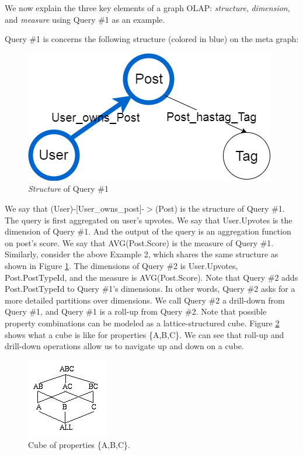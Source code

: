 We now explain the three key elements of a graph OLAP: \textit{structure}, \textit{dimension}, and \textit{measure}  using Query \#1 as an example.


Query \#1 is concerns the following structure (colored in blue) on the meta graph:

\begin{figure}[H]
\centering
\includegraphics[scale=0.5]{pic/meta1.png}
\caption{\textit{Structure} of Query \#1}
\label{fig:2:1}
\end{figure}



We say that (User)-[User\_owns\_post]-$>$(Post) is the structure of Query \#1. The query is first aggregated on user’s upvotes. We say that {User.Upvotes} is the dimension of Query \#1. And the output of the query is an aggregation function on post’s score.  We say that {AVG(Post.Score)} is the measure of Query \#1. Similarly, consider the above Example 2, which shares the same structure as shown in Figure \ref{fig:2:1}. The dimensions of Query \#2 is {User.Upvotes, Post.PostTypeId}, and the measure is {AVG(Post.Score)}. Note that Query \#2 adds Post.PostTypeId to Query \#1’s dimensions. In other words, Query \#2 asks for a more detailed partitions over dimensions. We call Query \#2 a drill-down from Query \#1, and  Query \#1 is a roll-up from Query \#2. Note that possible property combinations can be modeled as a lattice-structured cube. Figure \ref{fig:2:2} shows what a cube is like for properties \{A,B,C\}. We can see that roll-up and drill-down operations allow us to navigate up and down on a cube.


\begin{figure}[H]
\centering
\includegraphics[scale=1]{pic/22.png}
\caption{Cube of properties \{A,B,C\}.}
\label{fig:2:2}
\end{figure}

